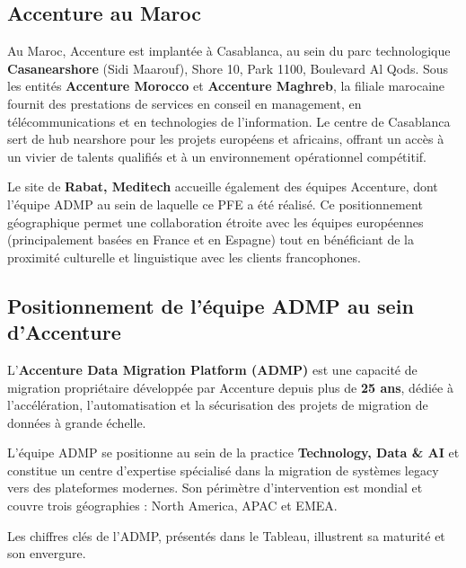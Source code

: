 \subsection{Accenture au Maroc}
\label{subsec:accenture-maroc}

Au Maroc, Accenture est implantée à Casablanca, au sein du parc technologique \textbf{Casanearshore} (Sidi Maarouf), Shore 10, Park 1100, Boulevard Al Qods. Sous les entités \textbf{Accenture Morocco} et \textbf{Accenture Maghreb}, la filiale marocaine fournit des prestations de services en conseil en management, en télécommunications et en technologies de l'information. Le centre de Casablanca sert de hub nearshore pour les projets européens et africains, offrant un accès à un vivier de talents qualifiés et à un environnement opérationnel compétitif.

Le site de \textbf{Rabat, Meditech} accueille également des équipes Accenture, dont l'équipe ADMP au sein de laquelle ce PFE a été réalisé. Ce positionnement géographique permet une collaboration étroite avec les équipes européennes (principalement basées en France et en Espagne) tout en bénéficiant de la proximité culturelle et linguistique avec les clients francophones.

\subsection{Positionnement de l'équipe ADMP au sein d'Accenture}
\label{subsec:admp-positionnement}

L'\textbf{Accenture Data Migration Platform (ADMP)} est une capacité de migration propriétaire développée par Accenture depuis plus de \textbf{25 ans}, dédiée à l'accélération, l'automatisation et la sécurisation des projets de migration de données à grande échelle.

L'équipe ADMP se positionne au sein de la practice \textbf{Technology, Data \& AI} et constitue un centre d'expertise spécialisé dans la migration de systèmes legacy vers des plateformes modernes. Son périmètre d'intervention est mondial et couvre trois géographies : North America, APAC et EMEA.

Les chiffres clés de l'ADMP, présentés dans le Tableau, illustrent sa maturité et son envergure.

